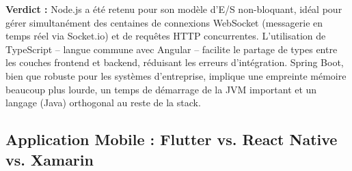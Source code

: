 \textbf{Verdict :} Node.js a été retenu pour son modèle d'E/S non-bloquant, idéal pour gérer simultanément des centaines de connexions WebSocket (messagerie en temps réel via Socket.io) et de requêtes HTTP concurrentes. L'utilisation de TypeScript -- langue commune avec Angular -- facilite le partage de types entre les couches frontend et backend, réduisant les erreurs d'intégration. Spring Boot, bien que robuste pour les systèmes d'entreprise, implique une empreinte mémoire beaucoup plus lourde, un temps de démarrage de la JVM important et un langage (Java) orthogonal au reste de la stack.

\subsection{Application Mobile : Flutter vs. React Native vs. Xamarin}

\begin{table}[H]
\centering
\renewcommand{\arraystretch}{1.4}
\caption{Comparaison des frameworks mobiles -- Justification du choix Flutter}
\end{table}

